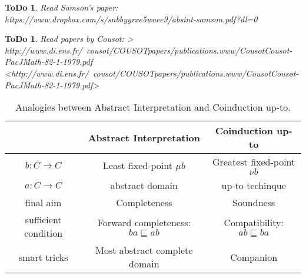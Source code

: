 \documentclass[smallcondensed,envcountsect,envcountsame]{svjour3}     %
\newtheorem{todo}[theorem]{\bf ToDo}
\begin{document}
\begin{todo}
Read Samson's paper: https://www.dropbox.com/s/snbbyyrxe5waee9/absint-samson.pdf?dl=0
\end{todo}

\begin{todo}
Read papers by Cousot: > http://www.di.ens.fr/~cousot/COUSOTpapers/publications.www/CousotCousot-PacJMath-82-1-1979.pdf <http://www.di.ens.fr/~cousot/COUSOTpapers/publications.www/CousotCousot-PacJMath-82-1-1979.pdf>
\end{todo}







\newpage
\begin{table}[t]
\begin{center}
\begin{tabular}{ccc}
& Abstract Interpretation & Coinduction up-to\\
\hline
$b\colon C\to C$& Least fixed-point $\mu b$ & Greatest fixed-point $\nu b$\\
$a\colon C\to C$& abstract domain & up-to techinque \\
final aim & Completeness & Soundness \\
sufficient condition & Forward completeness: $ba \sqsubseteq ab$ & Compatibility: $ab\sqsubseteq ba$ \\
smart tricks & Most abstract complete domain & Companion \\
\end{tabular}
\caption{Analogies between Abstract Interpretation and Coinduction up-to.}\label{table:analogies}
\end{center}
\end{table}
\end{document}
